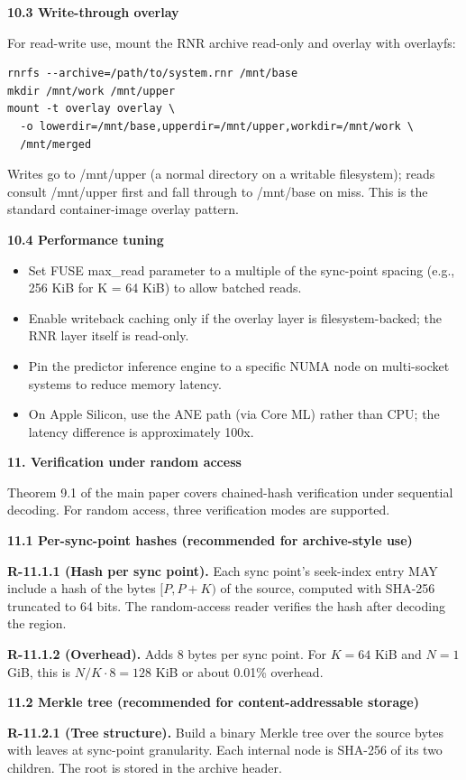 \documentclass[
]{article}
\begin{document}
\textbf{10.3 Write-through overlay}

For read-write use, mount the RNR archive read-only and overlay with
overlayfs:
\begin{verbatim}
rnrfs --archive=/path/to/system.rnr /mnt/base
mkdir /mnt/work /mnt/upper
mount -t overlay overlay \
  -o lowerdir=/mnt/base,upperdir=/mnt/upper,workdir=/mnt/work \
  /mnt/merged
\end{verbatim}

Writes go to /mnt/upper (a normal directory on a writable filesystem);
reads consult /mnt/upper first and fall through to /mnt/base on miss.
This is the standard container-image overlay pattern.

\textbf{10.4 Performance tuning}

\begin{itemize}
\item
  Set FUSE max\_read parameter to a multiple of the sync-point spacing
  (e.g., 256 KiB for K = 64 KiB) to allow batched reads.
\item
  Enable writeback caching only if the overlay layer is
  filesystem-backed; the RNR layer itself is read-only.
\item
  Pin the predictor inference engine to a specific NUMA node on
  multi-socket systems to reduce memory latency.
\item
  On Apple Silicon, use the ANE path (via Core ML) rather than CPU; the
  latency difference is approximately 100x.
\end{itemize}

\textbf{11. Verification under random access}

Theorem 9.1 of the main paper covers chained-hash verification under
sequential decoding. For random access, three verification modes are
supported.

\textbf{11.1 Per-sync-point hashes (recommended for archive-style use)}

\textbf{R-11.1.1 (Hash per sync point).} Each sync point's
seek-index entry MAY include a hash of the bytes $[P, P+K)$ of the
source, computed with SHA-256 truncated to 64 bits. The
random-access reader verifies the hash after decoding the region.

\textbf{R-11.1.2 (Overhead).} Adds 8 bytes per sync point. For
$K = 64$ KiB and $N = 1$ GiB, this is $N/K \cdot 8 = 128$ KiB or
about 0.01\% overhead.

\textbf{11.2 Merkle tree (recommended for content-addressable storage)}

\textbf{R-11.2.1 (Tree structure).} Build a binary Merkle tree over the
source bytes with leaves at sync-point granularity. Each internal node
is SHA-256 of its two children. The root is stored in the archive
header.
\end{document}
